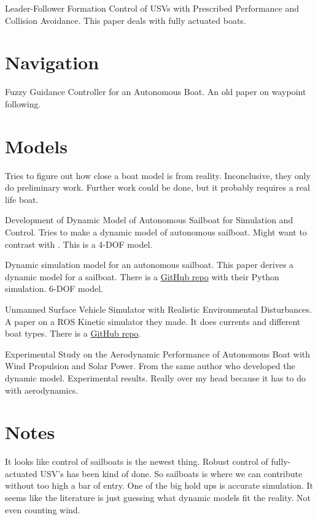 \documentclass[conference]{IEEEtran}
\begin{document}
\cite{Dai2017} Leader-Follower Formation Control of USVs with Prescribed Performance and Collision Avoidance. This paper deals with fully actuated boats.


\section{Navigation}
\cite{Vaneck1997} Fuzzy Guidance Controller for an Autonomous Boat. An old paper on waypoint following.


\section{Models}
\cite{Huang2017} Tries to figure out how close a boat model is from reality. Inconclusive, they only do preliminary work. Further work could be done, but it probably requires a real life boat.

\cite{Setiawan2020} Development of Dynamic Model of Autonomous Sailboat for Simulation and Control. Tries to make a dynamic model of autonomous sailboat. Might want to contrast with \cite{Buehler2018}. This is a 4-DOF model.

\cite{Buehler2018} Dynamic simulation model for an autonomous sailboat. This paper derives a dynamic model for a sailboat. There is a \href{https://github.com/simonkohaut/stda-sailboat-simulator/tree/master/src}{GitHub repo} with their Python simulation. 6-DOF model.

\cite{Paravisi2019} Unmanned Surface Vehicle Simulator with Realistic Environmental Disturbances. A paper on a ROS Kinetic simulator they made. It does currents and different boat types. There is a \href{https://github.com/disaster-robotics-proalertas/usv_sim_lsa}{GitHub repo}.

\cite{Setiawan2020} Experimental Study on the Aerodynamic Performance of Autonomous Boat with Wind Propulsion and Solar Power. From the same author who developed the dynamic model. Experimental results. Really over my head because it has to do with aerodynamics.

\section{Notes}
It looks like control of sailboats is the newest thing. Robust control of fully-actuated USV's has been kind of done. So sailboats is where we can contribute without too high a bar of entry. One of the big hold ups is accurate simulation. It seems like the literature is just guessing what dynamic models fit the reality. Not even counting wind.


\end{document}
